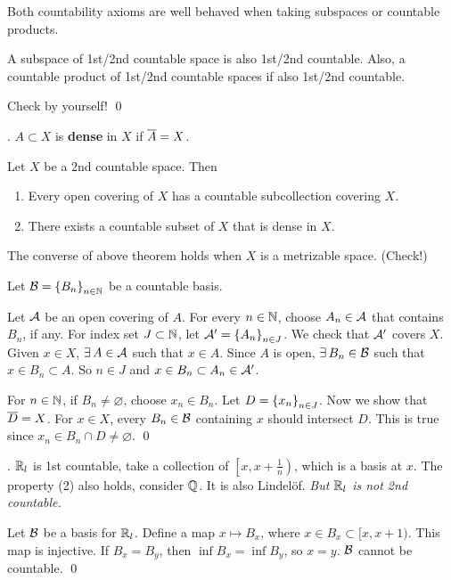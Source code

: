 Both countability axioms are well behaved when taking subspaces or countable products.

 A subspace of 1st/2nd countable space is also 1st/2nd countable. Also, a countable product of 1st/2nd countable spaces if also 1st/2nd countable.

\pf Check by yourself! \qed

\medskip

.  \(A \subset X\) is \textbf{dense} in \(X\) if \(\overline{A} = X\).

 Let \(X\) be a 2nd countable space. Then
\begin{enumerate}
    \item {} Every open covering of \(X\) has a countable subcollection covering \(X\).
    \item There exists a countable subset of \(X\) that is dense in \(X\).
\end{enumerate}

\rmk The converse of above theorem holds when \(X\) is a metrizable space. (Check!)

\pf Let \(\mathcal{B} = \left\{ B_n \right\}_{n\in \mathbb{N}}\) be a countable basis.

 Let \(\mathcal{A}\) be an open covering of \(A\). For every \(n \in \mathbb{N}\), choose \(A_n \in \mathcal{A}\) that contains \(B_n\), if any. For index set \(J \subset \mathbb{N}\), let \(\mathcal{A}' = \left\{ A_n \right\}_{n \in J}\). We check that \(\mathcal{A}'\) covers \(X\). Given \(x \in X\), \(\exists A \in \mc{A}\) such that \(x \in A\). Since \(A\) is open, \(\exists B_n \in \mc{B}\) such that \(x \in B_n \subset A\). So \(n \in J\) and \(x \in B_n \subset A_n \in \mathcal{A}'\).

 For \(n \in \mathbb{N}\), if \(B_n \neq \varnothing\), choose \(x_n \in B_n\). Let \(D = \left\{ x_n \right\}_{n \in J}\). Now we show that \(\overline{D} = X\). For \(x \in X\), every \(B_n \in \mathcal{B}\) containing \(x\) should intersect \(D\). This is true since \(x_n \in B_n \cap D \neq \varnothing\). \qed

\ex. \(\mathbb{R}_l\) is 1st countable, take a collection of \(\left[x, x + \frac{1}{n}\right)\), which is a basis at \(x\). The property (2) also holds, consider \(\mathbb{Q}\). It is also Lindelöf. \textit{But \(\mathbb{R}_l\) is not 2nd countable.}

\pf Let \(\mathcal{B}\) be a basis for \(\mathbb{R}_l\). Define a map \(x \mapsto B_x\), where \(x \in B_x \subset [x, x+1)\). This map is injective. If \(B_x = B_y\), then \(\inf B_x = \inf B_y\), so \(x = y\). \(\mathcal{B}\) cannot be countable. \qed

